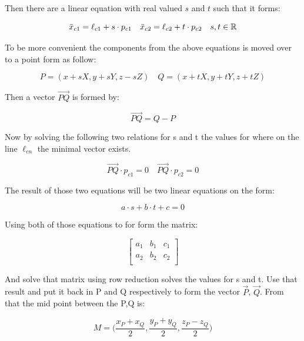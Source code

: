 Then there are a linear equation with real valued $s$ and $t$ such that it forms:

\begin{equation}
    \bar x_{c1} = \ell_{c1} + s\cdot p_{c1} \quad \bar x_{c2} = \ell_{c2} + t\cdot p_{c2}\quad s,t\in \mathbb{R}
\end{equation}

To be more convenient the components from the above equations is moved over to a point form as follow:

\begin{equation}
    P = (x+sX, y+sY,z-sZ)\quad
    Q = (x+tX, y+tY,z+tZ)
\end{equation}

Then a vector $\overrightarrow {PQ}$ is formed by:

\begin{equation}
    \overrightarrow {PQ} = Q - P
\end{equation}

Now by solving the following two relations for s and t the values for where on the line $\ell_{cn}$ the minimal vector exists.

\begin{equation}
    \overrightarrow{PQ}\cdot p_{c1}=0 \quad  \overrightarrow{PQ}\cdot p_{c2} = 0
\end{equation}

The result of those two equations will be two linear equations on the form:

\begin{equation}
    a\cdot s + b\cdot t + c = 0
\end{equation}

Using both of those equations to for form the matrix:

\begin{equation}
    \begin{bmatrix}
        a_1 & b_1 & c_1\\
        a_2 & b_2 & c_2\\
    \end{bmatrix}
\end{equation}

And solve that matrix using row reduction solves the values for s and t.
Use that result and put it back in P and Q respectively to form the vector $\overrightarrow{P}$, $\overrightarrow{Q}$.
From that the mid point between the P,Q is:

\begin{equation}
    M = \big( \frac{x_P + x_Q}{2}, \frac{y_P + y_Q}{2}, \frac{z_P - z_Q}{2} \big)
\end{equation}

